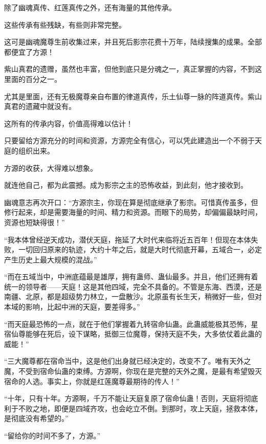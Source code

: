 \begin{this_body}
除了幽魂真传、红莲真传之外，还有海量的其他传承。

这些传承有些残缺，有些则非常完整。

这可是幽魂魔尊生前收集过来，并且死后影宗花费十万年，陆续搜集的成果。全部都便宜了方源！

紫山真君的遗赠，虽然也丰富，但他到底只是分魂之一，真正掌握的内容，不到这里面的百分之一。

尤其是里面，还有无极魔尊亲自布置的律道真传，乐土仙尊一脉的阵道真传。紫山真君的遗藏中就没有。

这所有的传承内容，价值高得难以估计！

只要留给方源充分的时间和资源，方源完全有信心，可以凭此建造出一个不弱于天庭的组织出来。

方源的收获，大得难以想象。

就连他自己，都为此震撼。成为影宗之主的恐怖收益，到此刻，他才接收到。

幽魂意志再次开口：“方源宗主，你现在算是彻底继承了影宗。可惜真传虽多，但修行起来，却是需要海量的时间、精力和资源。而眼下的局势，却偏偏最缺时间，资源也短缺得很！”

“我本体曾经逆天成功，潜伏天庭，拖延了大时代来临将近五百年！但现在本体失败，一切回归原来的轨迹，大约十年之后，就是大时代彻底开幕，五域合一，必定产生历史上最大规模的混战。”

“而在五域当中，中洲底蕴最是雄厚，拥有蛊师、蛊仙最多。并且，他们还拥有着统一的领导者——天庭！这是其他四域，完全不具备的。不管是东海、西漠，还是南疆、北原，都是超级势力林立，一盘散沙。北原虽有长生天，稍微好一些，但对本域的影响，比起中洲的天庭，要差得多。”

“而天庭最恐怖的一点，就在于他们掌握着九转宿命仙蛊。此蛊威能极其恐怖，星宿仙尊能够在死后，设下谋略，抵御三位魔尊，保持天庭不失，大多依仗着此蛊的威能！”

“三大魔尊都在宿命当中，这是他们出身就已经决定的，改变不了。唯有天外之魔，不受到宿命仙蛊的束缚。方源啊，你现在是完整的天外之魔，是最有希望毁灭宿命的人选。事实上，你就是红莲魔尊最期待的传人！”

“十年，只有十年。方源啊，千万不能让天庭复原了宿命仙蛊！否则，天庭将彻底利于不败之地，即便是四域齐攻，也会屹立不倒。到那时，攻上天庭，拯救本体，是彻底没有希望的。”

“留给你的时间不多了，方源。”

\end{this_body}

